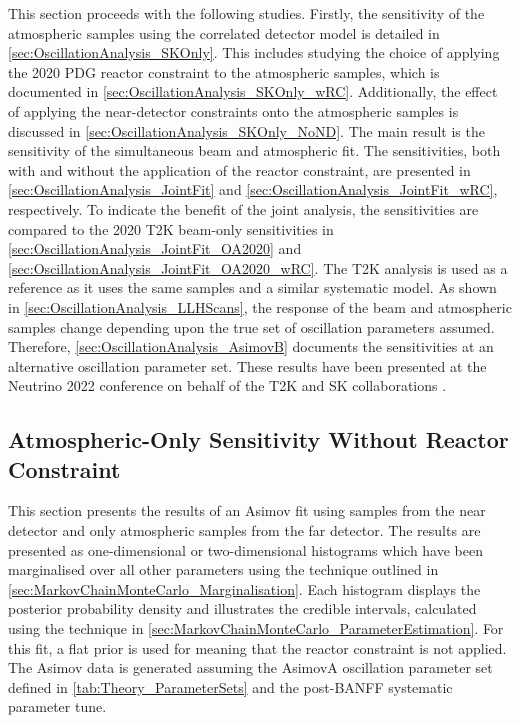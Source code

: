 This section proceeds with the following studies. Firstly, the sensitivity of the atmospheric samples using the correlated detector model is detailed in \autoref{sec:OscillationAnalysis_SKOnly}. This includes studying the choice of applying the 2020 PDG reactor constraint \cite{Particle_Data_Group2020-ms} to the atmospheric samples, which is documented in \autoref{sec:OscillationAnalysis_SKOnly_wRC}. Additionally, the effect of applying the near-detector constraints onto the atmospheric samples is discussed in \autoref{sec:OscillationAnalysis_SKOnly_NoND}. The main result is the sensitivity of the simultaneous beam and atmospheric fit. The sensitivities, both with and without the application of the reactor constraint, are presented in \autoref{sec:OscillationAnalysis_JointFit} and \autoref{sec:OscillationAnalysis_JointFit_wRC}, respectively. To indicate the benefit of the joint analysis, the sensitivities are compared to the 2020 T2K beam-only sensitivities \cite{Dunne2020-uf, t2k_tn_393} in \autoref{sec:OscillationAnalysis_JointFit_OA2020} and \autoref{sec:OscillationAnalysis_JointFit_OA2020_wRC}. The T2K analysis is used as a reference as it uses the same samples and a similar systematic model. As shown in \autoref{sec:OscillationAnalysis_LLHScans}, the response of the beam and atmospheric samples change depending upon the true set of oscillation parameters assumed. Therefore, \autoref{sec:OscillationAnalysis_AsimovB} documents the sensitivities at an alternative oscillation parameter set. These results have been presented at the Neutrino 2022 conference on behalf of the T2K and SK collaborations \cite{Bronner2022-wd}.

\subsection{Atmospheric-Only Sensitivity Without Reactor Constraint}
\label{sec:OscillationAnalysis_SKOnly}

This section presents the results of an Asimov fit using samples from the near detector and only atmospheric samples from the far detector. The results are presented as one-dimensional or two-dimensional histograms which have been marginalised over all other parameters using the technique outlined in \autoref{sec:MarkovChainMonteCarlo_Marginalisation}. Each histogram displays the posterior probability density and illustrates the credible intervals, calculated using the technique in \autoref{sec:MarkovChainMonteCarlo_ParameterEstimation}. For this fit, a flat prior is used for  meaning that the reactor constraint is not applied. The Asimov data is generated assuming the AsimovA oscillation parameter set defined in \autoref{tab:Theory_ParameterSets} and the post-BANFF systematic parameter tune.

